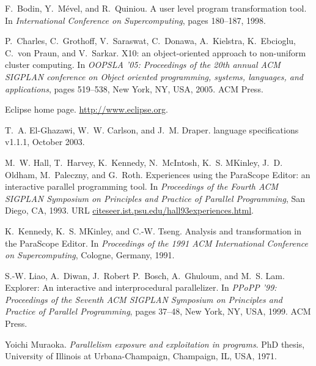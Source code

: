 \documentclass[natbib]{sigplanconf}
\begin{document}

\begin{thebibliography}{99}

F.~Bodin, Y.~M{\'e}vel, and R.~Quiniou.
\newblock A user level program transformation tool.
\newblock In {\em International Conference on Supercomputing}, pages 180--187,
  1998.

P.~Charles, C.~Grothoff, V.~Saraswat, C.~Donawa, A.~Kielstra, K.~Ebcioglu,
  C.~von Praun, and V.~Sarkar.
\newblock X10: an object-oriented approach to non-uniform cluster computing.
\newblock In {\em OOPSLA '05: Proceedings of the 20th annual ACM SIGPLAN
  conference on Object oriented programming, systems, languages, and
  applications}, pages 519--538, New York, NY, USA, 2005. ACM Press.

{Eclipse} home page.
\newblock \url{http://www.eclipse.org}.

T.~A. El-Ghazawi, W.~W. Carlson, and J.~M. Draper.
 language specifications v1.1.1, October 2003.

M.~W. Hall, T.~Harvey, K.~Kennedy, N.~McIntosh, K.~S. M\raisebox{.2em}{c}Kinley,
J.~D. Oldham, M.~Paleczny, and G.~Roth.
\newblock Experiences using the {Para{Scope} {Editor}}: an interactive parallel
  programming tool.
\newblock In \emph{Proceedings of the Fourth {ACM} {SIGPLAN} Symposium on
  Principles and Practice of Parallel Programming}, San Diego, CA, 1993.
\newblock URL \url{citeseer.ist.psu.edu/hall93experiences.html}.

K.~Kennedy, K.~S. M\raisebox{.2em}{c}Kinley, and C.-W. Tseng.
\newblock Analysis and transformation in the {Para{Scope} {Editor}}.
\newblock In {\em Proceedings of the 1991 {ACM} International Conference on
  Supercomputing}, Cologne, Germany, 1991.

S.-W. Liao, A.~Diwan, J.~Robert P.~Bosch, A.~Ghuloum, and M.~S. Lam.
 {Explorer}: An interactive and interprocedural
  parallelizer.
\newblock In {\em PPoPP '99: Proceedings of the Seventh ACM SIGPLAN Symposium
  on Principles and Practice of Parallel Programming}, pages 37--48, New York,
  NY, USA, 1999. ACM Press.

Yoichi Muraoka.
\newblock \emph{Parallelism exposure and exploitation in programs}.
\newblock PhD thesis, University of Illinois at Urbana-Champaign, Champaign,
  IL, USA, 1971.


\end{thebibliography}
\end{document}
